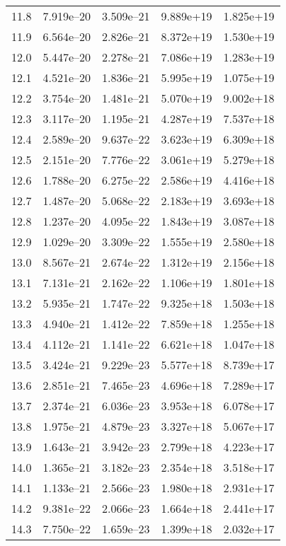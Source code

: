 \documentclass[a4paper,fleqn,usenatbib]{mnras}
\begin{document}
\begin{table*}
\begin{tabular}{ccccc}
    11.8 & 7.919e--20 & 3.509e--21 & 9.889e+19 & 1.825e+19 \\
    11.9 & 6.564e--20 & 2.826e--21 & 8.372e+19 & 1.530e+19 \\
    12.0 & 5.447e--20 & 2.278e--21 & 7.086e+19 & 1.283e+19 \\
    12.1 & 4.521e--20 & 1.836e--21 & 5.995e+19 & 1.075e+19 \\
    12.2 & 3.754e--20 & 1.481e--21 & 5.070e+19 & 9.002e+18 \\
    12.3 & 3.117e--20 & 1.195e--21 & 4.287e+19 & 7.537e+18 \\
    12.4 & 2.589e--20 & 9.637e--22 & 3.623e+19 & 6.309e+18 \\
    12.5 & 2.151e--20 & 7.776e--22 & 3.061e+19 & 5.279e+18 \\
    12.6 & 1.788e--20 & 6.275e--22 & 2.586e+19 & 4.416e+18 \\
    12.7 & 1.487e--20 & 5.068e--22 & 2.183e+19 & 3.693e+18 \\
    12.8 & 1.237e--20 & 4.095e--22 & 1.843e+19 & 3.087e+18 \\
    12.9 & 1.029e--20 & 3.309e--22 & 1.555e+19 & 2.580e+18 \\
    13.0 & 8.567e--21 & 2.674e--22 & 1.312e+19 & 2.156e+18 \\
    13.1 & 7.131e--21 & 2.162e--22 & 1.106e+19 & 1.801e+18 \\
    13.2 & 5.935e--21 & 1.747e--22 & 9.325e+18 & 1.503e+18 \\
    13.3 & 4.940e--21 & 1.412e--22 & 7.859e+18 & 1.255e+18 \\
    13.4 & 4.112e--21 & 1.141e--22 & 6.621e+18 & 1.047e+18 \\
    13.5 & 3.424e--21 & 9.229e--23 & 5.577e+18 & 8.739e+17 \\
    13.6 & 2.851e--21 & 7.465e--23 & 4.696e+18 & 7.289e+17 \\
    13.7 & 2.374e--21 & 6.036e--23 & 3.953e+18 & 6.078e+17 \\
    13.8 & 1.975e--21 & 4.879e--23 & 3.327e+18 & 5.067e+17 \\
    13.9 & 1.643e--21 & 3.942e--23 & 2.799e+18 & 4.223e+17 \\
    14.0 & 1.365e--21 & 3.182e--23 & 2.354e+18 & 3.518e+17 \\
    14.1 & 1.133e--21 & 2.566e--23 & 1.980e+18 & 2.931e+17 \\
    14.2 & 9.381e--22 & 2.066e--23 & 1.664e+18 & 2.441e+17 \\
    14.3 & 7.750e--22 & 1.659e--23 & 1.399e+18 & 2.032e+17 \\

\end{tabular}
\end{table*}
\end{document}
